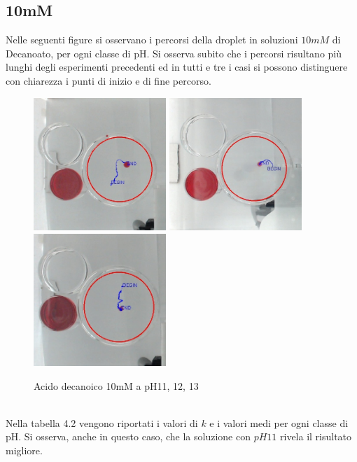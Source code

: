 \subsection{10mM}
Nelle seguenti figure si osservano i percorsi della droplet in soluzioni $10mM$ di Decanoato, per ogni classe di pH. Si osserva subito che i percorsi risultano più lunghi degli esperimenti precedenti ed in tutti e tre i casi si possono distinguere con chiarezza i punti di inizio e di fine percorso. 
\begin{figure}[h]
	\centering
   		{\includegraphics[width=5cm]{immagini/10mMph11-2.jpg}} %
 	\hspace{2mm}   	
		{\includegraphics[width=5cm]{immagini/10mMpH12-1.png}} %
	\hspace{2mm}   	
		{\includegraphics[width=5cm]{immagini/10mMpH13-2.jpg}}  %
	\caption{Acido decanoico 10mM a pH11, 12, 13}
\end{figure}
\\Nella tabella 4.2 vengono riportati i valori di $k$ e i valori medi per ogni classe di pH. Si osserva, anche in questo caso, che la soluzione con $pH11$ rivela il risultato migliore. 
